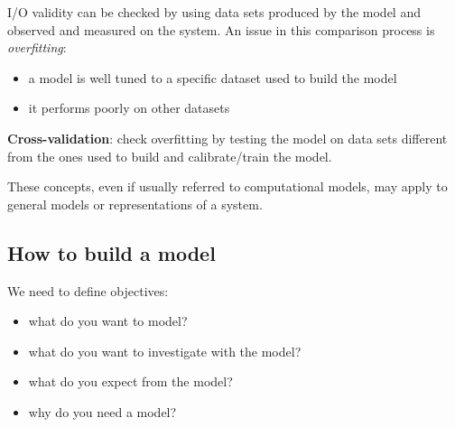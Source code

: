 I/O validity can be checked by using data sets produced by the model and
observed and measured on the system. An issue in this comparison process
is \emph{overfitting}:

\begin{itemize}
\tightlist
\item
  a model is well tuned to a specific dataset used to build the model
\item
  it performs poorly on other datasets
\end{itemize}

\textbf{Cross-validation}: check overfitting by testing the model on
data sets different from the ones used to build and calibrate/train the
model.

These concepts, even if usually referred to computational models, may
apply to general models or representations of a system.

\hypertarget{how-to-build-a-model}{%
\subsection{How to build a model}\label{how-to-build-a-model}}

We need to define objectives:

\begin{itemize}
\tightlist
\item
  what do you want to model?
\item
  what do you want to investigate with the model?
\item
  what do you expect from the model?
\item
  why do you need a model?
\end{itemize}


